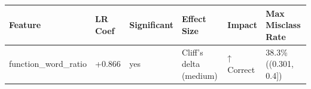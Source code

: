 \begin{tabular}{llllll}
\toprule
Feature & LR Coef & Significant & Effect Size & Impact & Max Misclass Rate \\
\midrule
function\_word\_ratio & +0.866 & yes & Cliff's delta (medium) & ↑ Correct & 38.3\% ((0.301, 0.4]) \\
\bottomrule
\end{tabular}
